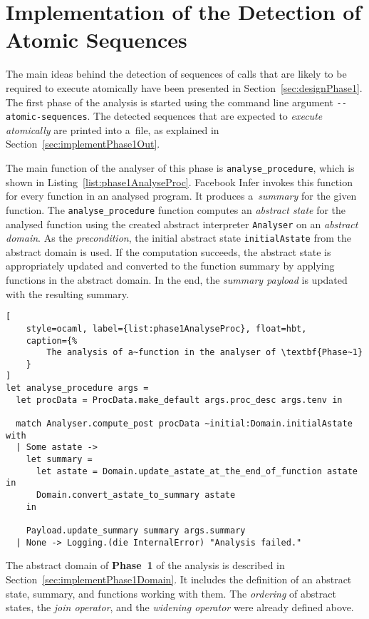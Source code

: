 \section{Implementation of the Detection of Atomic Sequences}
\label{sec:implementPhase1}

The main ideas behind the detection of sequences of calls that are
likely to be required to execute atomically have been presented in
Section~\ref{sec:designPhase1}. The first phase of the analysis is
started using the command line argument \texttt{{-}{-}atomic-sequences}.
The detected sequences that are expected to \emph{execute atomically}
are printed into a~file, as explained in
Section~\ref{sec:implementPhase1Out}.

The main function of the analyser of this phase is
\texttt{analyse\_procedure}, which is shown in
Listing~\ref{list:phase1AnalyseProc}. Facebook Infer invokes
this function for every function in an analysed program. It produces
a~\emph{summary} for the given function. The \texttt{analyse\_procedure}
function computes an \emph{abstract state} for the analysed function
using the created abstract interpreter \texttt{Analyser} on an
\emph{abstract domain}. As the \emph{precondition}, the initial
abstract state \texttt{initialAstate} from the abstract domain is
used. If the computation succeeds, the abstract state is appropriately
updated and converted to the function summary by applying functions
in the abstract domain. In the end, the \emph{summary payload} is
updated with the resulting summary.

\begin{lstlisting}[
    style=ocaml, label={list:phase1AnalyseProc}, float=hbt,
    caption={%
        The analysis of a~function in the analyser of \textbf{Phase~1}
    }
]
let analyse_procedure args =
  let procData = ProcData.make_default args.proc_desc args.tenv in

  match Analyser.compute_post procData ~initial:Domain.initialAstate with
  | Some astate ->
    let summary =
      let astate = Domain.update_astate_at_the_end_of_function astate in
      Domain.convert_astate_to_summary astate
    in

    Payload.update_summary summary args.summary
  | None -> Logging.(die InternalError) "Analysis failed."
\end{lstlisting}

The abstract domain of \textbf{Phase~1} of the analysis is described in
Section~\ref{sec:implementPhase1Domain}. It includes the definition of
an abstract state, summary, and functions working with them.
The \emph{ordering} of abstract states, the \emph{join operator}, and
the \emph{widening operator} were already defined above.


